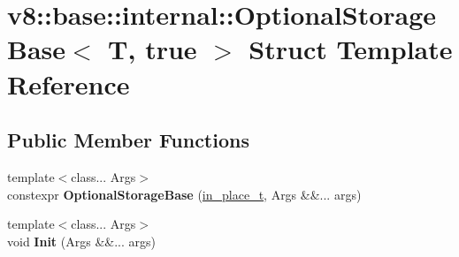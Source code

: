 \hypertarget{structv8_1_1base_1_1internal_1_1OptionalStorageBase_3_01T_00_01true_01_4}{}\section{v8\+:\+:base\+:\+:internal\+:\+:Optional\+Storage\+Base$<$ T, true $>$ Struct Template Reference}
\label{structv8_1_1base_1_1internal_1_1OptionalStorageBase_3_01T_00_01true_01_4}
\subsection*{Public Member Functions}
\begin{DoxyCompactItemize}
\item 
\mbox{\label{structv8_1_1base_1_1internal_1_1OptionalStorageBase_3_01T_00_01true_01_4_a6a6b3f093553ab423d1522924c16800d}} 
{\footnotesize template$<$class... Args$>$ }\\constexpr {\bfseries Optional\+Storage\+Base} (\mbox{\hyperlink{structv8_1_1base_1_1in__place__t}{in\+\_\+place\+\_\+t}}, Args \&\&... args)
\item 
\mbox{\label{structv8_1_1base_1_1internal_1_1OptionalStorageBase_3_01T_00_01true_01_4_a30d4b55c750f1ff9c22d2e1944a446f0}} 
{\footnotesize template$<$class... Args$>$ }\\void {\bfseries Init} (Args \&\&... args)
\end{DoxyCompactItemize}
